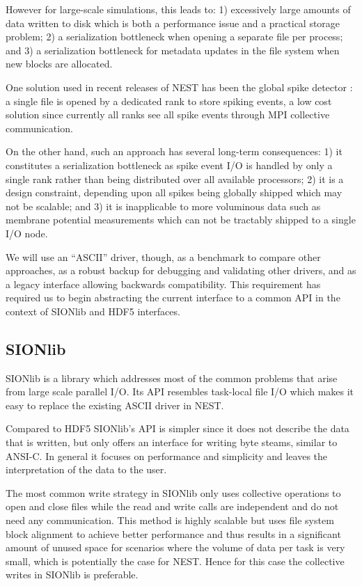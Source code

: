 \documentclass[]{YIC2015}
\begin{document}
However for large-scale simulations, this leads to: 1) excessively
large amounts of data written to disk which is both a performance
issue and a practical storage problem; 2) a serialization bottleneck
when opening a separate file per process; and 3) a serialization
bottleneck for metadata updates in the file system when new blocks are
allocated.


One solution used in recent releases of NEST has been the global spike
detector \cite{gsd}: a single file is opened by a dedicated rank to
store spiking events, a low cost solution since currently all ranks
see all spike events through MPI collective communication.

On the other hand, such an approach has several long-term
consequences: 1) it constitutes a serialization bottleneck as spike
event I/O is handled by only a single rank rather than being
distributed over all available processors; 2) it is a design
constraint, depending upon all spikes being globally shipped which may
not be scalable; and 3) it is inapplicable to more voluminous data
such as membrane potential measurements which can not be tractably
shipped to a single I/O node.

We will use an ``ASCII'' driver, though, as a benchmark to compare
other approaches, as a robust backup for debugging and validating
other drivers, and as a legacy interface allowing backwards
compatibility. This requirement has required us to begin abstracting
the current interface to a common API in the context of SIONlib and
HDF5 interfaces.

\subsection{SIONlib}

SIONlib \cite{frings2009scalable} is a library which addresses most of
the common problems that arise from large scale parallel I/O. Its API
resembles task-local file I/O which makes it easy to replace the
existing ASCII driver in NEST.

Compared to HDF5 SIONlib's API is simpler since it does not describe
the data that is written, but only offers an interface for writing
byte steams, similar to ANSI-C. In general it focuses on performance
and simplicity and leaves the interpretation of the data to the user.

The most common write strategy in SIONlib only uses collective
operations to open and close files while the read and write calls are
independent and do not need any communication. This method is highly
scalable but uses file system block alignment to achieve better
performance and thus results in a significant amount of unused space
for scenarios where the volume of data per task is very small, which
is potentially the case for NEST. Hence for this case the collective
writes in SIONlib is preferable.
\end{document}

